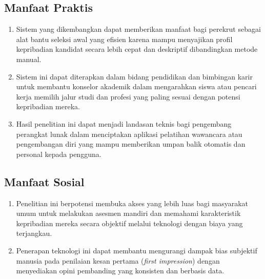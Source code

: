 \subsection{Manfaat Praktis}
\begin{enumerate}[nosep]
	\item Sistem yang dikembangkan dapat memberikan manfaat bagi perekrut sebagai alat bantu seleksi awal yang efisien karena mampu menyajikan profil kepribadian kandidat secara lebih cepat dan deskriptif dibandingkan metode manual.

	\item Sistem ini dapat diterapkan dalam bidang pendidikan dan bimbingan karir untuk membantu konselor akademik dalam mengarahkan siswa atau pencari kerja memilih jalur studi dan profesi yang paling sesuai dengan potensi kepribadian mereka.

	\item Hasil penelitian ini dapat menjadi landasan teknis bagi pengembang perangkat lunak dalam menciptakan aplikasi pelatihan wawancara atau pengembangan diri yang mampu memberikan umpan balik otomatis dan personal kepada pengguna.
\end{enumerate}

\subsection{Manfaat Sosial}
\begin{enumerate}[nosep]
	\item Penelitian ini berpotensi membuka akses yang lebih luas bagi masyarakat umum untuk melakukan asesmen mandiri dan memahami karakteristik kepribadian mereka secara objektif melalui teknologi dengan biaya yang terjangkau.

	\item Penerapan teknologi ini dapat membantu mengurangi dampak bias subjektif manusia pada penilaian kesan pertama (\textit{first impression}) dengan menyediakan opini pembanding yang konsisten dan berbasis data.
\end{enumerate}